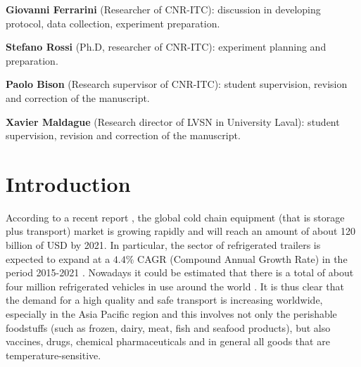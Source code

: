 \textbf{Giovanni Ferrarini} (Researcher of CNR-ITC): discussion in developing protocol, data collection, experiment preparation.

\textbf{Stefano Rossi} (Ph.D, researcher of CNR-ITC): experiment planning and preparation.

\textbf{Paolo Bison} (Research supervisor of CNR-ITC): student supervision, revision and correction of the manuscript. 

\textbf{Xavier Maldague} (Research director of LVSN in University Laval): student supervision, revision and correction of the manuscript.




% 

\newpage
\section{Introduction}
According to a recent report \citet{Zion2016}, the global cold chain equipment (that is storage plus transport) market is growing rapidly and will reach an amount of about 120 billion of USD by 2021. In particular, the sector of refrigerated trailers is expected to expand at a $ 4.4\% $ CAGR (Compound Annual Growth Rate) in the period 2015-2021 \citet{RM2015}. Nowadays it could be estimated that there is a total of about four million refrigerated vehicles in use around the world \citet{UNEP2010}. It is thus clear that the demand for a high quality and safe transport is increasing worldwide, especially in the Asia Pacific region and this involves not only the perishable foodstuffs (such as frozen, dairy, meat, fish and seafood products), but also vaccines, drugs, chemical pharmaceuticals and in general all goods that are temperature-sensitive. 

